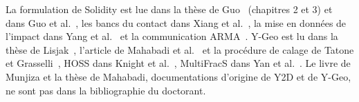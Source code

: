 La formulation de Solidity est lue dans la thèse de Guo~\cite{guo2014thesis} (chapitres 2 et 3) et dans Guo et al.~\cite{guo2020generic}, les bancs du contact dans Xiang et al.~\cite{xiang2009validation}, la mise en données de l'impact dans Yang et al.~\cite{yang2025validation,yang2026pulverisation} et la communication ARMA~\cite{yang2024energy}. Y-Geo est lu dans la thèse de Lisjak~\cite{lisjak2013thesis}, l'article de Mahabadi et al.~\cite{mahabadi2012ygeo} et la procédure de calage de Tatone et Grasselli~\cite{tatone2015}, HOSS dans Knight et al.~\cite{knight2020hoss}, MultiFracS dans Yan et al.~\cite{yan2023adaptive}. Le livre de Munjiza et la thèse de Mahabadi, documentations d'origine de Y2D et de Y-Geo, ne sont pas dans la bibliographie du doctorant.
